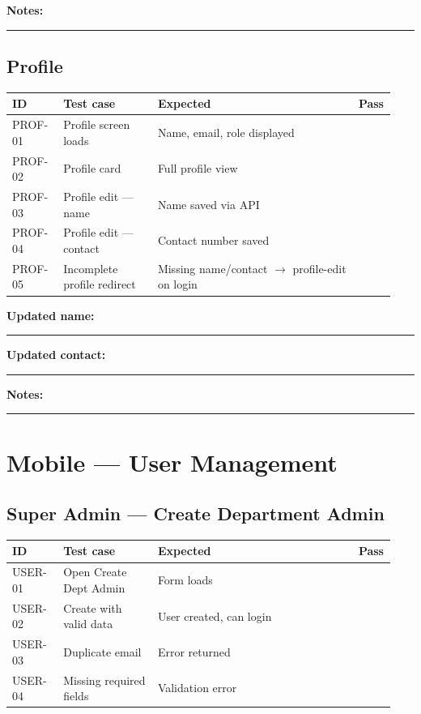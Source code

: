 \documentclass[11pt,a4paper,oneside]{article}
\newcommand{\chk}{\fbox{\rule{0pt}{1.05ex}\rule{1.05ex}{0pt}}}
\newcommand{\fillin}[1][3.5cm]{\rule{#1}{0.4pt}}
\newcommand{\fillinlong}{\rule{0.72\textwidth}{0.4pt}}
\newcommand{\notesblock}{\par\smallskip\noindent\textbf{Notes:}\ \fillinlong\par\smallskip}
\newcommand{\fieldline}[1]{\par\smallskip\noindent\textbf{#1}\ \fillin\par}
\newcommand{\tcheadfour}{%
  \toprule
  \textbf{ID} & \textbf{Test case} & \textbf{Expected} & \textbf{Pass} \\
  \midrule
}
\begin{document}
\notesblock

\subsection{Profile}

\small
\begin{tabular}{@{}>{\raggedright\arraybackslash}p{0.13\linewidth} >{\raggedright\arraybackslash}p{0.24\linewidth} >{\raggedright\arraybackslash}p{0.51\linewidth} >{\centering\arraybackslash}p{0.06\linewidth}@{}}
  \tcheadfour
  PROF-01 & Profile screen loads       & Name, email, role displayed                    & \chk \\
  PROF-02 & Profile card               & Full profile view                              & \chk \\
  PROF-03 & Profile edit — name        & Name saved via API                             & \chk \\
  PROF-04 & Profile edit — contact     & Contact number saved                           & \chk \\
  PROF-05 & Incomplete profile redirect& Missing name/contact $\rightarrow$ profile-edit on login & \chk \\
  \bottomrule
\end{tabular}
\normalsize

\fieldline{Updated name:}
\fieldline{Updated contact:}
\notesblock

\section{Mobile — User Management}

\subsection{Super Admin — Create Department Admin}

\small
\begin{tabular}{@{}>{\raggedright\arraybackslash}p{0.13\linewidth} >{\raggedright\arraybackslash}p{0.24\linewidth} >{\raggedright\arraybackslash}p{0.51\linewidth} >{\centering\arraybackslash}p{0.06\linewidth}@{}}
  \tcheadfour
  USER-01 & Open Create Dept Admin   & Form loads              & \chk \\
  USER-02 & Create with valid data   & User created, can login & \chk \\
  USER-03 & Duplicate email          & Error returned          & \chk \\
  USER-04 & Missing required fields  & Validation error        & \chk \\
  \bottomrule
\end{tabular}
\normalsize
\end{document}
